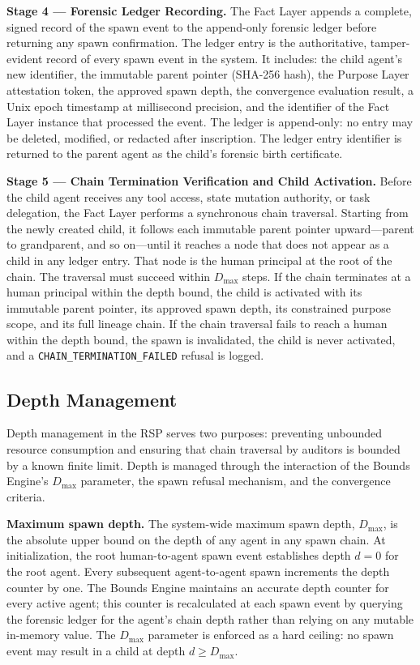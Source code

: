 \textbf{Stage 4 — Forensic Ledger Recording.} The Fact Layer appends a complete, signed record of the spawn event to the append-only forensic ledger before returning any spawn confirmation. The ledger entry is the authoritative, tamper-evident record of every spawn event in the system. It includes: the child agent's new identifier, the immutable parent pointer (SHA-256 hash), the Purpose Layer attestation token, the approved spawn depth, the convergence evaluation result, a Unix epoch timestamp at millisecond precision, and the identifier of the Fact Layer instance that processed the event. The ledger is append-only: no entry may be deleted, modified, or redacted after inscription. The ledger entry identifier is returned to the parent agent as the child's forensic birth certificate.

\textbf{Stage 5 — Chain Termination Verification and Child Activation.} Before the child agent receives any tool access, state mutation authority, or task delegation, the Fact Layer performs a synchronous chain traversal. Starting from the newly created child, it follows each immutable parent pointer upward—parent to grandparent, and so on—until it reaches a node that does not appear as a child in any ledger entry. That node is the human principal at the root of the chain. The traversal must succeed within $D_{\max}$ steps. If the chain terminates at a human principal within the depth bound, the child is activated with its immutable parent pointer, its approved spawn depth, its constrained purpose scope, and its full lineage chain. If the chain traversal fails to reach a human within the depth bound, the spawn is invalidated, the child is never activated, and a \texttt{CHAIN\_TERMINATION\_FAILED} refusal is logged.

\subsection{Depth Management}

Depth management in the RSP serves two purposes: preventing unbounded resource consumption and ensuring that chain traversal by auditors is bounded by a known finite limit. Depth is managed through the interaction of the Bounds Engine's $D_{\max}$ parameter, the spawn refusal mechanism, and the convergence criteria.

\textbf{Maximum spawn depth.} The system-wide maximum spawn depth, $D_{\max}$, is the absolute upper bound on the depth of any agent in any spawn chain. At initialization, the root human-to-agent spawn event establishes depth $d=0$ for the root agent. Every subsequent agent-to-agent spawn increments the depth counter by one. The Bounds Engine maintains an accurate depth counter for every active agent; this counter is recalculated at each spawn event by querying the forensic ledger for the agent's chain depth rather than relying on any mutable in-memory value. The $D_{\max}$ parameter is enforced as a hard ceiling: no spawn event may result in a child at depth $d \geq D_{\max}$.

